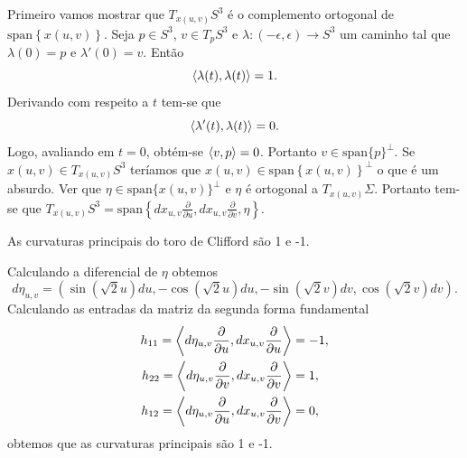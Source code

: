 \begin{demonstracao}
	Primeiro vamos mostrar que $T_{x(u,v)} S^3$ é o complemento ortogonal de $\text{span} \left\{x(u,v)\right\}$. Seja 
	$p \in S^3$,
	$ v \in T_p S^3 $
	e
	$\lambda: (-\epsilon, \epsilon) \rightarrow S^3$
	um caminho tal que
	$\lambda(0) = p$
	e
	$\lambda'(0) = v$.
	Então
	\begin{equation*}
	\left\langle \lambda(t),\lambda(t) \right\rangle = 1.
	\end{equation*}
	Derivando com respeito a $t$ tem-se que
	\begin{equation*}
	\left\langle \lambda'(t),\lambda(t) \right\rangle = 0.
	\end{equation*}
	Logo, avaliando em $ t=0 $, obtém-se
	$ \left\langle v,p \right\rangle = 0 $.
	Portanto
	$ v \in \text{span} \{p\}^\perp $.
	Se $x(u,v) \in T_{x(u,v)} S^3$ teríamos que $x(u,v) \in \text{span} \left\{x(u,v)\right\}^\perp$ o que é um absurdo.
	Ver que
	$\eta \in \text{span} \{x(u,v)\}^\perp$ e
	$\eta$ é ortogonal a $T_{x(u,v)} \Sigma$.
	Portanto tem-se que
	$T_{x(u,v)} S^3 = \text{span} \left\{dx_{u,v} \frac{\partial}{\partial u}, dx_{u,v} \frac{\partial}{\partial v}, \eta\right\}$.	
\end{demonstracao}


\begin{proposicao}
	As curvaturas principais do toro de Clifford são 1 e -1.
\end{proposicao}

\begin{demonstracao}
	Calculando a diferencial de $\eta$ obtemos
	\begin{equation*}
	d\eta_{u,v} = \left(\sin(\sqrt{2} u) du, -\cos(\sqrt{2} u) du, -\sin(\sqrt{2} v) dv, \cos(\sqrt{2} v) dv\right).
	\end{equation*}
	Calculando as entradas da matriz da segunda forma fundamental
	\begin{align*}
	h_{11} = \left\langle d\eta_{u,v} \frac{\partial}{\partial u},dx_{u,v} \frac{\partial}{\partial u} \right\rangle &= -1,\\
	h_{22} = \left\langle d\eta_{u,v} \frac{\partial}{\partial v},dx_{u,v} \frac{\partial}{\partial v} \right\rangle &= 1,\\
	h_{12} = \left\langle d\eta_{u,v} \frac{\partial}{\partial u},dx_{u,v} \frac{\partial}{\partial v} \right\rangle &= 0,
	\end{align*}
	obtemos que as curvaturas principais são 1 e -1.
\end{demonstracao}

